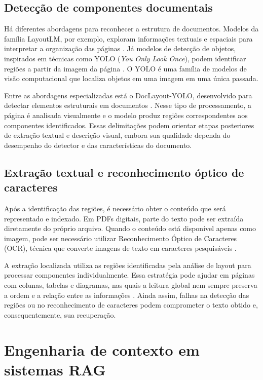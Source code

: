 \subsection{Detecção de componentes documentais}
\label{subsec:yolo_documentos}

Há diferentes abordagens para reconhecer a estrutura de documentos. Modelos da família LayoutLM, por exemplo, exploram informações textuais e espaciais para interpretar a organização das páginas . Já modelos de detecção de objetos, inspirados em técnicas como YOLO (\textit{You Only Look Once}), podem identificar regiões a partir da imagem da página . O YOLO é uma família de modelos de visão computacional que localiza objetos em uma imagem em uma única passada.

Entre as abordagens especializadas está o DocLayout-YOLO, desenvolvido para detectar elementos estruturais em documentos . Nesse tipo de processamento, a página é analisada visualmente e o modelo produz regiões correspondentes aos componentes identificados. Essas delimitações podem orientar etapas posteriores de extração textual e descrição visual, embora sua qualidade dependa do desempenho do detector e das características do documento.

\subsection{Extração textual e reconhecimento óptico de caracteres}
\label{subsec:ocr}

Após a identificação das regiões, é necessário obter o conteúdo que será representado e indexado. Em PDFs digitais, parte do texto pode ser extraída diretamente do próprio arquivo. Quando o conteúdo está disponível apenas como imagem, pode ser necessário utilizar Reconhecimento Óptico de Caracteres (OCR), técnica que converte imagens de texto em caracteres pesquisáveis .

A extração localizada utiliza as regiões identificadas pela análise de layout para processar componentes individualmente. Essa estratégia pode ajudar em páginas com colunas, tabelas e diagramas, nas quais a leitura global nem sempre preserva a ordem e a relação entre as informações . Ainda assim, falhas na detecção das regiões ou no reconhecimento de caracteres podem comprometer o texto obtido e, consequentemente, sua recuperação.

\section{Engenharia de contexto em sistemas RAG}
\label{sec:engenharia_contexto}

